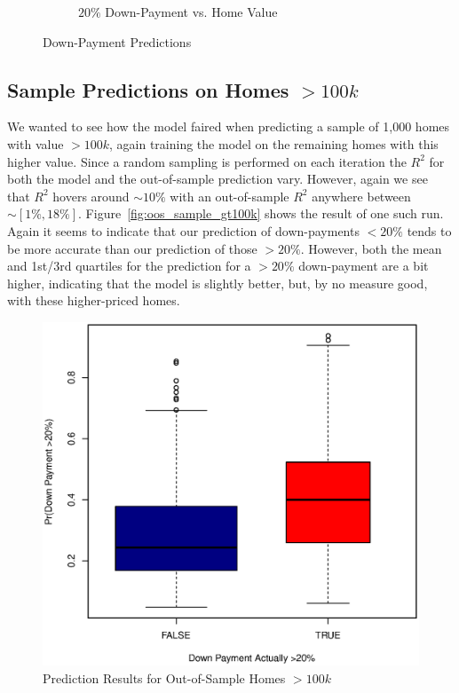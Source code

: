\documentclass[11pt, fleqn]{article}
\begin{document}
\begin{figure}
\begin{subfigure}[b]{0.49\textwidth}
    \caption{$20\%$ Down-Payment vs. Home Value}
    \label{fig:value_20dwn}
  \end{subfigure}
  \caption{Down-Payment Predictions}
\end{figure}

\subsection{Sample Predictions on Homes $>100k$}
We wanted to see how the model faired when predicting a sample of 1,000 homes with value $>100k$, again training the model on the remaining homes with this higher value.  Since a random sampling is performed on each iteration the $R^2$ for both the model and the out-of-sample prediction vary.  However, again we see that $R^2$ hovers around $\sim10\%$ with an out-of-sample $R^2$ anywhere between $\sim[1\%,18\%]$.  Figure~\vref{fig:oos_sample_gt100k} shows the result of one such run.  Again it seems to indicate that our prediction of down-payments $<20\%$ tends to be more accurate than our prediction of those $>20\%$.  However, both the mean and 1st/3rd quartiles for the prediction for a $>20\%$ down-payment are a bit higher, indicating that the model is slightly better, but, by no measure good, with these higher-priced homes.

\begin{figure}[!htb]
  \centering
  \includegraphics[scale=.5]{oos_subsample_100k.eps}
  \caption{Prediction Results for Out-of-Sample Homes $>100k$}
  \label{fig:oos_sample_gt100k}
\end{figure}
\end{document}
